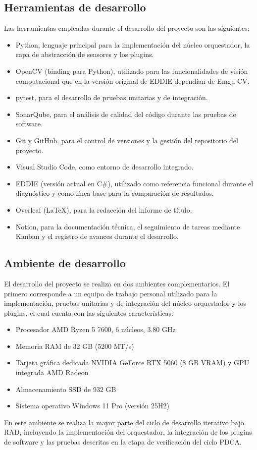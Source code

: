 \subsection{Herramientas de desarrollo}
Las herramientas empleadas durante el desarrollo del proyecto son las siguientes:
\begin{itemize}
\item Python, lenguaje principal para la implementación del núcleo orquestador, la capa de
abstracción de sensores y los plugins.
\item OpenCV (binding para Python), utilizado para las funcionalidades de visión computacional que en la versión original de EDDIE dependían de Emgu CV.
\item pytest, para el desarrollo de pruebas unitarias y de integración.
\item SonarQube, para el análisis de calidad del código durante las pruebas de software.
\item Git y GitHub, para el control de versiones y la gestión del repositorio del proyecto.
\item Visual Studio Code, como entorno de desarrollo integrado.
\item EDDIE (versión actual en C\#), utilizado como referencia funcional durante el diagnóstico y como línea base para la comparación de resultados.
\item Overleaf (LaTeX), para la redacción del informe de título.
\item Notion, para la documentación técnica, el seguimiento de tareas mediante Kanban y
el registro de avances durante el desarrollo.
\end{itemize}

\subsection{Ambiente de desarrollo}
El desarrollo del proyecto se realiza en dos ambientes complementarios. El primero corresponde a un equipo de trabajo personal utilizado para la implementación, pruebas unitarias y de integración del núcleo orquestador y los plugins, el cual cuenta con las siguientes características:
\begin{itemize}
\item Procesador AMD Ryzen 5 7600, 6 núcleos, 3.80 GHz
\item Memoria RAM de 32 GB (5200 MT/s)
\item Tarjeta gráfica dedicada NVIDIA GeForce RTX 5060 (8 GB VRAM) y GPU integrada AMD Radeon
\item Almacenamiento SSD de 932 GB
\item Sistema operativo Windows 11 Pro (versión 25H2) 
\end{itemize}
En este ambiente se realiza la mayor parte del ciclo de desarrollo iterativo bajo RAD, incluyendo la implementación del orquestador, la integración de los plugins de software y las pruebas descritas en la etapa de verificación del ciclo PDCA. 

